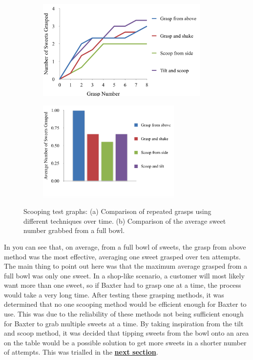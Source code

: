 \begin{figure}[H]
    \captionsetup[subfigure]{justification=centering}
    \begin{subfigure}[b]{0.475\textwidth}   
        \centering 
        \caption{}
        \label{fig:timegrasp}
        \includegraphics[width=\textwidth, height=5cm]{graspovertime.png}
    \end{subfigure}
    \begin{subfigure}[b]{0.475\textwidth}   
        \centering 
        \caption{}
        \label{fig:averagegrasp}
        \includegraphics[width=\textwidth, height=5cm]{averagegrasp.png}
    \end{subfigure}
    \caption{Scooping test graphs: (a) Comparison of repeated grasps using different techniques over time. (b) Comparison of the average sweet number grabbed from a full bowl.}
\end{figure}In \textbf{} you can see that, on average, from a full bowl of sweets, the grasp from above method was the most effective, averaging one sweet grasped over ten attempts. The main thing to point out here was that the maximum average grasped from a full bowl was only one sweet. In a shop-like scenario, a customer will most likely want more than one sweet, so if Baxter had to grasp one at a time, the process would take a very long time. After testing these grasping methods, it was determined that no one scooping method would be efficient enough for Baxter to use. This was due to the reliability of these methods not being sufficient enough for Baxter to grab multiple sweets at a time. By taking inspiration from the tilt and scoop method, it was decided that tipping sweets from the bowl onto an area on the table would be a possible solution to get more sweets in a shorter number of attempts. This was trialled in the  \hyperref[sssec:tippingmethods]{\textbf{next section}}.
